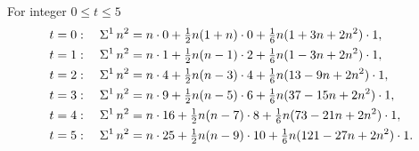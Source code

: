 \begin{example} 
  For integer $0 \leq t \leq 5$
  \begin{align*}
    t=0:\quad
    \Sigma^{1}\,{n}^{2}
    &= n\cdot0 + \tfrac12 n(1+n)\cdot0 + \tfrac16 n(1+3n+2n^2)\cdot1,
    \\
    t=1:\quad
    \Sigma^{1}\,{n}^{2}
    &= n\cdot1 + \tfrac12 n(n-1)\cdot2 + \tfrac16 n(1-3n+2n^2)\cdot1,
    \\
    t=2:\quad
    \Sigma^{1}\,{n}^{2}
    &= n\cdot4 + \tfrac12 n(n-3)\cdot4 + \tfrac16 n(13-9n+2n^2)\cdot1,
    \\
    t=3:\quad
    \Sigma^{1}\,{n}^{2}
    &= n\cdot9 + \tfrac12 n(n-5)\cdot6 + \tfrac16 n(37-15n+2n^2)\cdot1,
    \\
    t=4:\quad
    \Sigma^{1}\,{n}^{2}
    &= n\cdot16 + \tfrac12 n(n-7)\cdot8 + \tfrac16 n(73-21n+2n^2)\cdot1,
    \\
    t=5:\quad
    \Sigma^{1}\,{n}^{2}
    &= n\cdot25 + \tfrac12 n(n-9)\cdot10 + \tfrac16 n(121-27n+2n^2)\cdot1.
  \end{align*}
\end{example}
